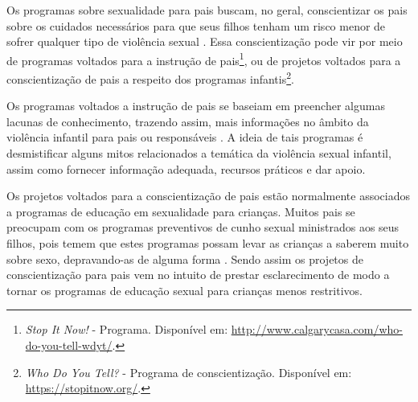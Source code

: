 
Os programas sobre sexualidade para pais buscam, no geral, conscientizar os pais sobre os cuidados necessários para que seus filhos tenham um risco menor de sofrer qualquer tipo de violência sexual \cite{pelisoli2010prevenccao}. Essa conscientização pode vir por meio de programas voltados para a instrução de pais\footnote{\textit{\label{note:nota2}Stop It Now!} - Programa. Disponível em: \url{http://www.calgarycasa.com/who-do-you-tell-wdyt/}.}, ou de projetos voltados para a conscientização de pais a respeito dos programas infantis\footnote{\textit{\label{note:nota3}Who Do You Tell?} - Programa de conscientização. Disponível em: \url{https://stopitnow.org/}.}. 

Os programas voltados a instrução de pais se baseiam em preencher algumas lacunas de conhecimento, trazendo assim, mais informações no âmbito da violência infantil para pais ou responsáveis \cite{maria2010papel}. A ideia de tais programas é desmistificar alguns mitos relacionados a temática da violência sexual infantil, assim como fornecer informação adequada, recursos práticos e dar apoio.

Os projetos voltados para a conscientização de pais estão normalmente associados a programas de educação em sexualidade para crianças. Muitos pais se preocupam com os programas preventivos de cunho sexual ministrados aos seus filhos, pois temem que estes programas possam levar as crianças a saberem muito sobre sexo, depravando-as de alguma forma \cite{chen2007prevention}. Sendo assim os projetos de conscientização para pais vem no intuito de prestar esclarecimento de modo a tornar os programas de educação sexual para crianças menos restritivos. 

